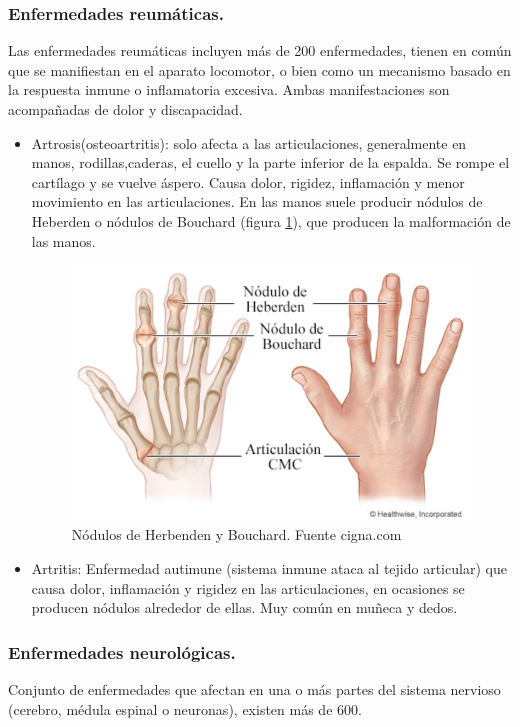 \subsubsection{Enfermedades reumáticas.}
Las enfermedades reumáticas incluyen más de 200 enfermedades, tienen en común que se manifiestan en el aparato locomotor, o bien como un mecanismo basado en la respuesta inmune o inflamatoria excesiva. Ambas manifestaciones son acompañadas de dolor y discapacidad. 
\cite{enfermedades_Reumáticas}
\begin{itemize}
    \item Artrosis(osteoartritis): solo afecta a las articulaciones, generalmente en manos, rodillas,caderas, el cuello y la parte inferior de la espalda. Se rompe el cartílago y se vuelve áspero. Causa dolor, rigidez, inflamación y menor movimiento en las articulaciones. En las manos suele producir nódulos de Heberden o nódulos de Bouchard (figura \ref{fig:Nódulos}), que producen la malformación de las manos. \cite{osteoartritis}
\cite{nodulos}
    \begin{figure}
        \centering
        \includegraphics[width=0.75\linewidth]{img/Nodulos.png}
        \caption{Nódulos de Herbenden y Bouchard. Fuente cigna.com}
        \label{fig:Nódulos}
    \end{figure}
    \item Artritis: Enfermedad autimune (sistema inmune ataca al tejido articular) que causa dolor, inflamación y rigidez en las articulaciones, en ocasiones se producen nódulos alrededor de ellas. 
    Muy común en muñeca y dedos. \cite{artritis}
\end{itemize}

\subsubsection{Enfermedades neurológicas.}
Conjunto de enfermedades que afectan en una o más partes del sistema nervioso (cerebro, médula espinal o neuronas), existen más de 600. 

